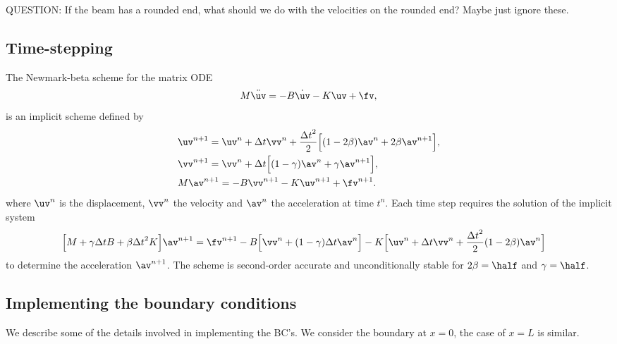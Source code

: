 \documentclass[11pt]{article}
\newcommand{\dt}{{\Delta t}}
\begin{document}
QUESTION: If the beam has a rounded end, what should we do with the velocities on the rounded end? Maybe just ignore
these. 


\subsection{Time-stepping}
The Newmark-beta scheme for the matrix ODE 
\begin{align*}
   M \ddot\uv = -B \dot\uv - K \uv + \fv ,
\end{align*}
is an implicit scheme defined by
\begin{align*}
 &  \uv^{n+1} = \uv^n + \dt\vv^n + \frac{\dt^2}{2}\Big[ (1-2\beta) \av^n + 2\beta \av^{n+1} \Big],  \\
 &  \vv^{n+1} = \vv^n + \dt\Big[  (1-\gamma) \av^n + \gamma \av^{n+1} \Big]    , \\
 &  M \av^{n+1} = -B \vv^{n+1} -K \uv^{n+1} + \fv^{n+1} .
\end{align*}
where $\uv^n$ is the displacement, $\vv^n$ the velocity and $\av^n$ the acceleration at time $t^n$. 
Each time step requires the solution of the implicit system
\begin{align}
 &  \Big[ M + \gamma\dt B + \beta\dt^2 K \Big] \av^{n+1} =
      \fv^{n+1} 
      - B \Big[ \vv^n + (1-\gamma) \dt \av^n \Big] 
      - K\Big[ \uv^n + \dt\vv^n + \frac{\dt^2}{2} (1-2\beta) \av^n \Big] 
   \label{eq:NewmarkMatrix}
\end{align}
to determine the acceleration $\av^{n+1}$. 
The scheme is second-order accurate and unconditionally stable for $2\beta=\half$ and $\gamma=\half$. 

\subsection{Implementing the boundary conditions} \label{eq:BeamModel_FEM_BC}

We describe some of the details involved in implementing the BC's. We consider the 
boundary at $x=0$, the case of $x=L$ is similar. 
\end{document}

